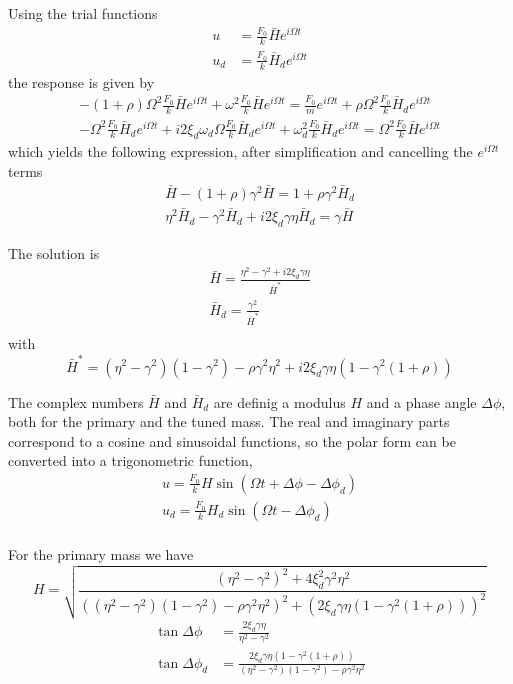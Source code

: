 \documentclass{article}
\begin{document}
Using the trial functions
\begin{align*}
    u &= \frac{F_0}{k}\bar{H}e^{i\Omega t} \\[2pt]
    u_d &= \frac{F_0}{k}\bar{H}_de^{i\Omega t}
\end{align*}
the response is given by
\begin{gather*}
    -(1+\rho)\Omega^2\frac{F_0}{k}\bar{H}e^{i\Omega t} + \omega^2\frac{F_0}{k}\bar{H}e^{i\Omega t} =
        \frac{F_0}{m}e^{i\Omega t} + \rho\Omega^2\frac{F_0}{k}\bar{H}_de^{i\Omega t} \\
    -\Omega^2\frac{F_0}{k}\bar{H}_de^{i\Omega t} + i2\xi_d\omega_d\Omega\frac{F_0}{k}\bar{H}_d e^{i\Omega t} +
        \omega_d^2\frac{F_0}{k}\bar{H}_de^{i\Omega t} = \Omega^2\frac{F_0}{k}\bar{H}e^{i\Omega t}
\end{gather*}
which yields the following expression, after simplification and cancelling the $e^{i\Omega t}$ terms
\begin{gather*}
    \bar{H} - (1+\rho)\gamma^2\bar{H} = 1 + \rho\gamma^2\bar{H}_d \\
    \eta^2\bar{H}_d - \gamma^2\bar{H}_d + i2\xi_d\gamma\eta\bar{H}_d = \gamma\bar{H}
\end{gather*}

The solution is
\begin{gather*}
    \bar{H} = \frac{\eta^2 - \gamma^2 + i2\xi_d\gamma\eta}{\bar{H}^*} \\
    \bar{H}_d = \frac{\gamma^2}{\bar{H}^*} \\
\end{gather*}
with
$$
\bar{H}^* = (\eta^2-\gamma^2)(1-\gamma^2) - \rho\gamma^2\eta^2 + i2\xi_d\gamma\eta(1-\gamma^2(1+\rho))
$$

The complex numbers $\bar{H}$ and $\bar{H}_d$ are definig a modulus $H$ and a phase angle $\Delta\phi$, both for the primary and the tuned mass. The real and imaginary parts correspond to a cosine and sinusoidal functions, so the polar form can be converted into a trigonometric function,
\begin{gather*}
    u = \frac{F_0}{k}H\sin(\Omega t + \Delta\phi - \Delta\phi_d) \\
    u_d = \frac{F_0}{k}H_d\sin(\Omega t - \Delta\phi_d) \\
\end{gather*}

For the primary mass we have
$$
H = \sqrt{\frac{(\eta^2-\gamma^2)^2 + 4\xi_d^2\gamma^2\eta^2}
    {((\eta^2-\gamma^2)(1-\gamma^2)-\rho\gamma^2\eta^2)^2 + (2\xi_d\gamma\eta(1-\gamma^2(1+\rho)))^2}}
$$
\begin{align*}
    \tan\Delta\phi &= \frac{2\xi_d\gamma\eta}{\eta^2-\gamma^2} \\
    \tan\Delta\phi_d &= \frac{2\xi_d\gamma\eta(1-\gamma^2(1+\rho))}{(\eta^2-\gamma^2)(1-\gamma^2) - \rho\gamma^2\eta^2}
\end{align*}
\end{document}
